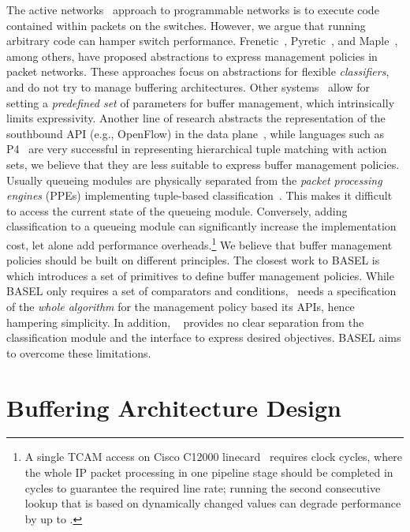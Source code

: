 \documentclass{article}
\newcommand{\barch}{BASEL}
\begin{document}
The active networks~\cite{TennenhouseW96} approach to programmable networks is to execute code contained within packets on the switches. However, we argue that running arbitrary code can hamper switch performance.
Frenetic~\cite{FosterHFMRSW11}, Pyretic~\cite{MonsantoRFRW13}, and Maple~\cite{VoellmyWYFH13}, among others, have proposed 
abstractions to express management policies in packet networks. These approaches focus on abstractions for flexible \emph{classifiers}, and do not try to manage buffering architectures.
Other systems~\cite{SouleBMPKSF14,ShiehKGK10,FergusonGLFK13} allow for setting a \emph{predefined set} of parameters for
buffer management, which intrinsically limits expressivity. 
Another line of research abstracts the representation of the southbound API (e.g., OpenFlow) in the data plane~\cite{BosshartDGIMRSTVVW14,Song13,KozanitisHSV10}, while languages such as P4~\cite{BosshartDGIMRSTVVW14} are very successful in representing hierarchical tuple matching with action sets, we believe that they are less suitable to express buffer management policies. Usually queueing modules are physically separated from the \emph{packet processing engines}
(PPEs) implementing tuple-based classification~\cite{qfp,crs1}. This makes it difficult to access the current state of the queueing module. Conversely, adding classification to a queueing module can significantly increase the implementation cost, let alone add performance overheads.\footnote{A single TCAM access on Cisco C12000 linecard~\cite{pinnacle}
requires  clock cycles, where the whole IP packet processing in one pipeline stage should be completed in  cycles to guarantee the required line rate; running the second consecutive lookup that is based on dynamically changed values can degrade performance by up to .}
We believe that buffer management policies should be built on different principles. 
The closest work to \barch{} is ~\cite{SivaramanWSB13} which introduces a set of primitives to define buffer management policies. While \barch{} only requires a set of comparators and conditions,~\cite{SivaramanWSB13} needs a specification
of the \emph{whole algorithm} for the management policy based its APIs, hence hampering simplicity. In addition, ~\cite{SivaramanWSB13} 
provides no clear separation from the classification module and the interface to express desired objectives. 
\barch{} aims to overcome these limitations.

\section{Buffering Architecture Design}\label{sec:overv-buff-arch}
\end{document}
